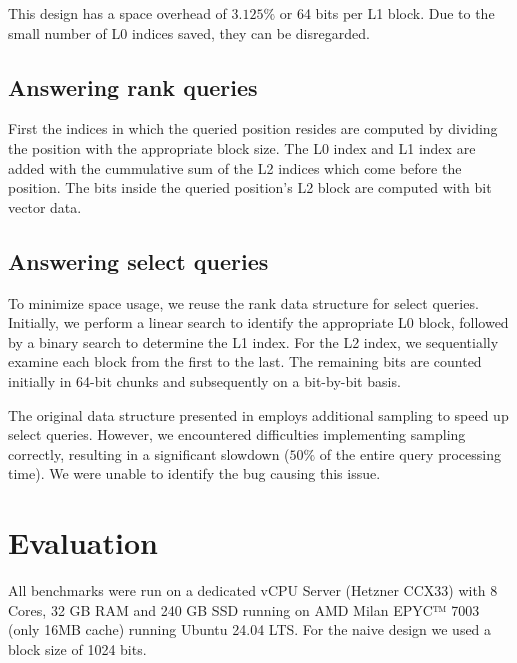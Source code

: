 \documentclass[a4paper,UKenglish,cleveref, autoref, thm-restate]{lipics-v2021}
\begin{document}
This design has a space overhead of $3.125\%$ or 64 bits per L1 block.
Due to the small number of L0 indices saved, they can be disregarded.

\subsection{Answering rank queries}
First the indices in which the queried position resides are computed
by dividing the position with the appropriate block size. The L0 index and L1 index are
added with the cummulative sum of the L2 indices which come before the position.
The bits inside the queried position's L2 block are computed with bit vector data.

\subsection{Answering select queries}
To minimize space usage, we reuse the rank data structure for select
queries. Initially, we perform a linear search to identify the appropriate
L0 block, followed by a binary search to determine the L1 index. For the L2 index, we sequentially examine each
block from the first to the last. The remaining bits are counted initially
in 64-bit chunks and subsequently on a bit-by-bit basis.

The original data structure presented in \cite{zhou2013space} employs
additional sampling to speed up select queries. However,
we encountered difficulties implementing sampling correctly,
resulting in a significant slowdown ($50\%$ of the entire query processing time).
We were unable to identify the bug causing this issue.

\section{Evaluation}
\label{sec:Evaluation}
All benchmarks were run on a dedicated vCPU Server (Hetzner CCX33) with 8 Cores,
32 GB RAM and 240 GB SSD running on AMD Milan EPYC™ 7003 (only 16MB cache) running Ubuntu 24.04 LTS.
For the naive design we used a block size of 1024 bits.
\end{document}
